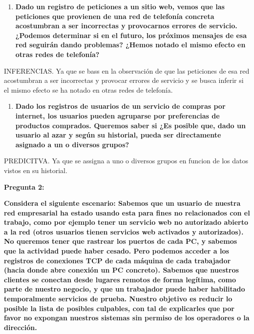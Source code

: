 \documentclass[
]{article}
\providecommand{\tightlist}{%
  \setlength{\itemsep}{0pt}\setlength{\parskip}{0pt}}
\begin{document}
\begin{enumerate}
\def\labelenumi{\arabic{enumi}.}
\setcounter{enumi}{2}
\tightlist
\item
  \textbf{Dado un registro de peticiones a un sitio web, vemos que las
  peticiones que provienen de una red de telefonía concreta acostumbran
  a ser incorrectas y provocarnos errores de servicio. ¿Podemos
  determinar si en el futuro, los próximos mensajes de esa red seguirán
  dando problemas? ¿Hemos notado el mismo efecto en otras redes de
  telefonía?}
\end{enumerate}

INFERENCIAS. Ya que se bass en la observación de que las peticiones de
esa red acostumbran a ser incorrectas y provocar errores de servicio y
se busca inferir si el mismo efecto se ha notado en otras redes de
telefonía.

\begin{enumerate}
\def\labelenumi{\arabic{enumi}.}
\setcounter{enumi}{3}
\tightlist
\item
  \textbf{Dado los registros de usuarios de un servicio de compras por
  internet, los usuarios pueden agruparse por preferencias de productos
  comprados. Queremos saber si ¿Es posible que, dado un usuario al azar
  y según su historial, pueda ser directamente asignado a un o diversos
  grupos?}
\end{enumerate}

PREDICITVA. Ya que se assigna a uno o diversos grupos en funcion de los
datos vistos en su historial.

\textbf{Pregunta 2:}

\textbf{Considera el siguiente escenario: Sabemos que un usuario de
nuestra red empresarial ha estado usando esta para fines no relacionados
con el trabajo, como por ejemplo tener un servicio web no autorizado
abierto a la red (otros usuarios tienen servicios web activados y
autorizados). No queremos tener que rastrear los puertos de cada PC, y
sabemos que la actividad puede haber cesado. Pero podemos acceder a los
registros de conexiones TCP de cada máquina de cada trabajador (hacia
donde abre conexión un PC concreto). Sabemos que nuestros clientes se
conectan desde lugares remotos de forma legítima, como parte de nuestro
negocio, y que un trabajador puede haber habilitado temporalmente
servicios de prueba. Nuestro objetivo es reducir lo posible la lista de
posibles culpables, con tal de explicarles que por favor no expongan
nuestros sistemas sin permiso de los operadores o la dirección.}
\end{document}
